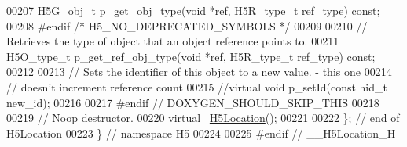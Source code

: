 \begin{DoxyCode}
00207         H5G\_obj\_t p\_get\_obj\_type(\textcolor{keywordtype}{void} *ref, H5R\_type\_t ref\_type) \textcolor{keyword}{const};
00208 \textcolor{preprocessor}{#endif }\textcolor{comment}{/* H5\_NO\_DEPRECATED\_SYMBOLS */}\textcolor{preprocessor}{}
00209 
00210         \textcolor{comment}{// Retrieves the type of object that an object reference points to.}
00211         H5O\_type\_t p\_get\_ref\_obj\_type(\textcolor{keywordtype}{void} *ref, H5R\_type\_t ref\_type) \textcolor{keyword}{const};
00212 
00213         \textcolor{comment}{// Sets the identifier of this object to a new value. - this one}
00214         \textcolor{comment}{// doesn't increment reference count}
00215         \textcolor{comment}{//virtual void p\_setId(const hid\_t new\_id);}
00216 
00217 \textcolor{preprocessor}{#endif // DOXYGEN\_SHOULD\_SKIP\_THIS}
00218 
00219         \textcolor{comment}{// Noop destructor.}
00220         \textcolor{keyword}{virtual} ~\hyperlink{class_h5_1_1_h5_location}{H5Location}();
00221 
00222 \}; \textcolor{comment}{// end of H5Location}
00223 \} \textcolor{comment}{// namespace H5}
00224 
00225 \textcolor{preprocessor}{#endif // \_\_H5Location\_H}
\end{DoxyCode}
